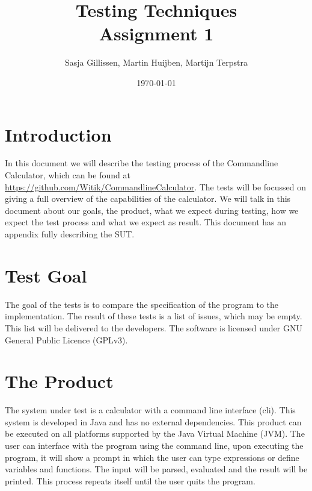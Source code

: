 \documentclass[11pt,a4paper]{article}
\author{Sasja Gillissen, Martin Huijben, Martijn Terpstra}
\date{\today}
\title{Testing Techniques\\
  \textbf{Assignment 1}}
\begin{document}
\maketitle

\section{Introduction}
In this document we will describe the testing process of the
Commandline Calculator, which can be found at
\url{https://github.com/Witik/CommandlineCalculator}. The tests will
be focussed on giving a full overview of the capabilities of the
calculator. We will talk in this document about our goals, the
product, what we expect during testing, how we expect the test process
and what we expect as result. This document has an appendix fully
describing the SUT.

\section{Test Goal}
The goal of the tests is to compare the specification of the program to the implementation. The result of these tests is a list of issues, which may be empty. This list will be delivered to the developers. The software is licensed under GNU General Public Licence (GPLv3).



\section{The Product}
The system under test is a calculator with a command line interface (cli). This system is developed in Java and has no external dependencies. This product can be executed on all platforms supported by the Java Virtual Machine (JVM). The user can interface with the program using the command line, upon executing the program, it will show a prompt in which the user can type expressions or define variables and functions. The input will be parsed, evaluated and the result will be printed. This process repeats itself until the user quits the program.
\end{document}
